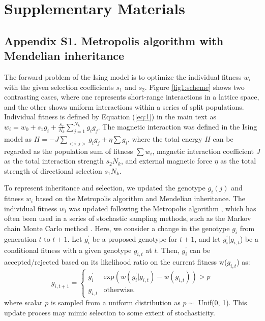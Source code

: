 \documentclass[12pt,]{article}
\newcommand{\beginsupplement}{%
        \setcounter{table}{0}
        \renewcommand{\thetable}{S\arabic{table}}%
        \setcounter{figure}{0}
        \renewcommand{\thefigure}{S\arabic{figure}}%
        \setcounter{equation}{0}
        \renewcommand{\theequation}{S\arabic{equation}}
     }
\begin{document}
\clearpage

\section*{Supplementary Materials}
\beginsupplement

\medskip

\subsection*{Appendix S1. Metropolis algorithm with Mendelian inheritance}
The forward problem of the Ising model is to optimize the individual fitness $w_i$ with the given selection coefficients $s_1$ and $s_2$. Figure \ref{fig1:scheme} shows two contrasting cases, where one represents short-range interactions in a lattice space, and the other shows uniform interactions within a series of split populations. Individual fitness is defined by Equation (\ref{eq:1}) in the main text as $w_i = w_0 + s_1 g_i + \frac{s_2}{N_k}\sum^{N_{k}}_{j=1}{g_ig_j}$. The magnetic interaction was defined in the Ising model as $H = -J\sum_{<i,j>}{g_ig_j} + \eta\sum{g_i}$, where the total energy $H$ can be regarded as the population sum of fitness $\sum{w_i}$, magnetic interaction coefficient $J$ as the total interaction strength $s_2N_k$, and external magnetic force $\eta$ as the total strength of directional selection $s_1N_k$.

To represent inheritance and selection, we updated the genotype $g_i(j)$ and fitness $w_i$ based on the Metropolis algorithm and Mendelian inheritance. The individual fitness $w_i$ was updated following the Metropolis algorithm \citep{metropolis1953equation}, which has often been used in a series of stochastic sampling methods, such as the Markov chain Monte Carlo method \citep{bishop2006_11}. Here, we consider a change in the genotype $g_i$ from generation $t$ to $t+1$. Let $g^\prime_i$ be a proposed genotype for $t+1$, and let $g^\prime_i$|$g_{i,t}$) be a conditional fitness with a given genotype $g_{i,t}$ at $t$. Then, $g^\prime_i$ can be accepted/rejected based on its likelihood ratio on the current fitness w($g_{i,t}$) as:
\[
  g_{i,t+1} = \begin{cases}
    g_i^\prime & \mathrm{exp}(w(g^\prime_i|g_{i,t}) - w(g_{i,t})) > p \\
    g_{i,t} & \mathrm{otherwise.}
  \end{cases}
\]
where scalar $p$ is sampled from a uniform distribution as $p \sim$ Unif(0, 1). This update process may mimic selection to some extent of stochasticity.
\end{document}
